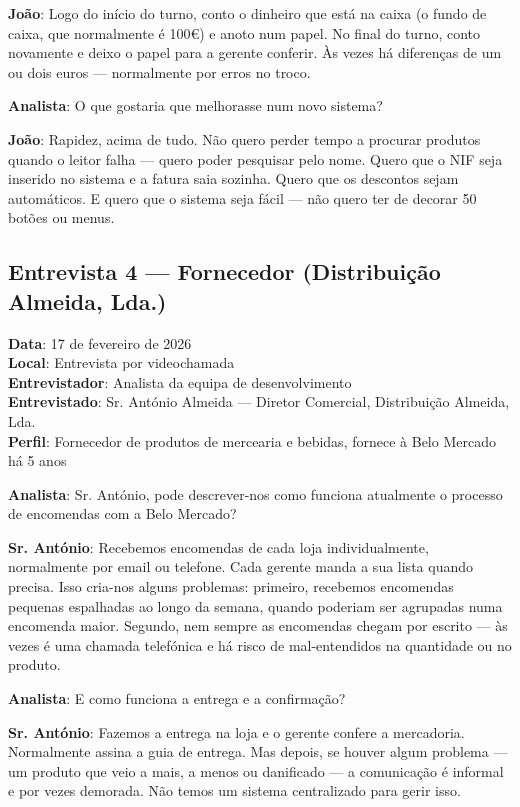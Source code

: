 \documentclass[a4paper,12pt]{scrreprt}
\begin{document}
\textbf{João}: Logo do início do turno, conto o dinheiro que está na caixa (o fundo de caixa, que normalmente é 100€) e anoto num papel. No final do turno, conto novamente e deixo o papel para a gerente conferir. Às vezes há diferenças de um ou dois euros --- normalmente por erros no troco.

\textbf{Analista}: O que gostaria que melhorasse num novo sistema?

\textbf{João}: Rapidez, acima de tudo. Não quero perder tempo a procurar produtos quando o leitor falha --- quero poder pesquisar pelo nome. Quero que o NIF seja inserido no sistema e a fatura saia sozinha. Quero que os descontos sejam automáticos. E quero que o sistema seja fácil --- não quero ter de decorar 50 botões ou menus.

\subsection*{Entrevista 4 --- Fornecedor (Distribuição Almeida, Lda.)}
\textbf{Data}: 17 de fevereiro de 2026\\
\textbf{Local}: Entrevista por videochamada\\
\textbf{Entrevistador}: Analista da equipa de desenvolvimento\\
\textbf{Entrevistado}: Sr. António Almeida --- Diretor Comercial, Distribuição Almeida, Lda.\\
\textbf{Perfil}: Fornecedor de produtos de mercearia e bebidas, fornece à Belo Mercado há 5 anos

\textbf{Analista}: Sr. António, pode descrever-nos como funciona atualmente o processo de encomendas com a Belo Mercado?

\textbf{Sr. António}: Recebemos encomendas de cada loja individualmente, normalmente por email ou telefone. Cada gerente manda a sua lista quando precisa. Isso cria-nos alguns problemas: primeiro, recebemos encomendas pequenas espalhadas ao longo da semana, quando poderiam ser agrupadas numa encomenda maior. Segundo, nem sempre as encomendas chegam por escrito --- às vezes é uma chamada telefónica e há risco de mal-entendidos na quantidade ou no produto.

\textbf{Analista}: E como funciona a entrega e a confirmação?

\textbf{Sr. António}: Fazemos a entrega na loja e o gerente confere a mercadoria. Normalmente assina a guia de entrega. Mas depois, se houver algum problema --- um produto que veio a mais, a menos ou danificado --- a comunicação é informal e por vezes demorada. Não temos um sistema centralizado para gerir isso.
\end{document}

